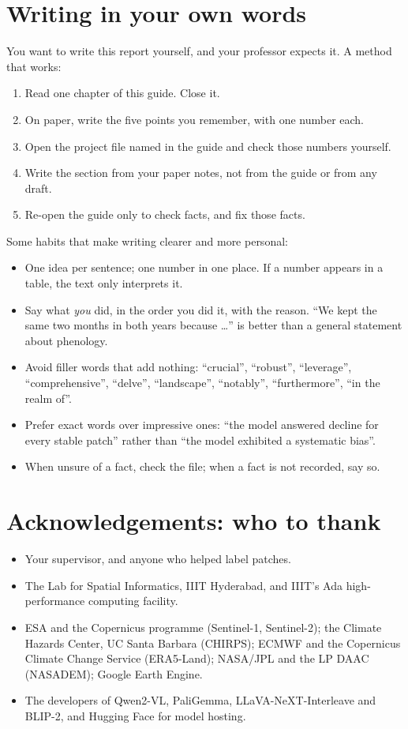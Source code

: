 \section{Writing in your own words}
\label{sec:ownwords}

You want to write this report yourself, and your professor expects it. A method that works:
\begin{enumerate}
  \item Read one chapter of this guide. Close it.
  \item On paper, write the five points you remember, with one number each.
  \item Open the project file named in the guide and check those numbers yourself.
  \item Write the section from your paper notes, not from the guide or from any draft.
  \item Re-open the guide only to check facts, and fix those facts.
\end{enumerate}

Some habits that make writing clearer and more personal:
\begin{itemize}
  \item One idea per sentence; one number in one place. If a number appears in a table, the text only interprets it.
  \item Say what \emph{you} did, in the order you did it, with the reason. ``We kept the same two months in both years because \dots'' is better than a general statement about phenology.
  \item Avoid filler words that add nothing: ``crucial'', ``robust'', ``leverage'', ``comprehensive'', ``delve'', ``landscape'', ``notably'', ``furthermore'', ``in the realm of''.
  \item Prefer exact words over impressive ones: ``the model answered decline for every stable patch'' rather than ``the model exhibited a systematic bias''.
  \item When unsure of a fact, check the file; when a fact is not recorded, say so.
\end{itemize}

\section{Acknowledgements: who to thank}
\label{sec:ack}

\begin{itemize}
  \item Your supervisor, and anyone who helped label patches.
  \item The Lab for Spatial Informatics, IIIT Hyderabad, and IIIT's Ada high-performance computing facility.
  \item ESA and the Copernicus programme (Sentinel-1, Sentinel-2); the Climate Hazards Center, UC Santa Barbara (CHIRPS); ECMWF and the Copernicus Climate Change Service (ERA5-Land); NASA/JPL and the LP DAAC (NASADEM); Google Earth Engine.
  \item The developers of Qwen2-VL, PaliGemma, LLaVA-NeXT-Interleave and BLIP-2, and Hugging Face for model hosting.
\end{itemize}


